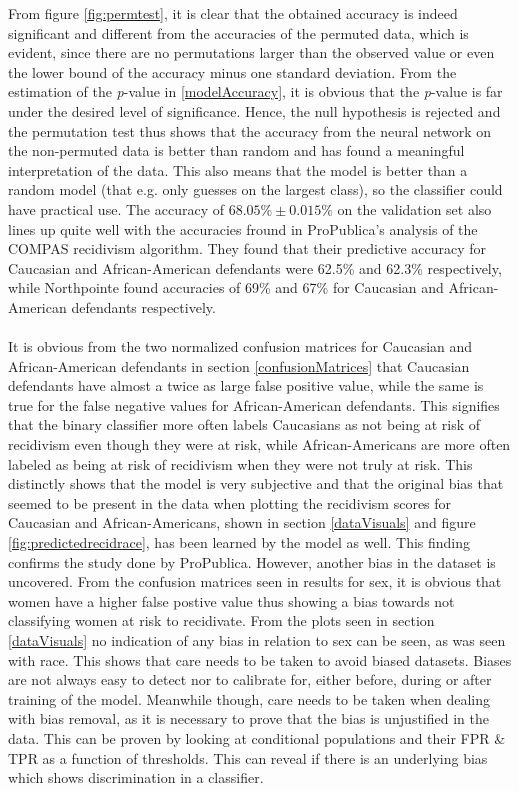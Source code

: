 \documentclass[11pt, fleqn, titlepage]{article}
\begin{document}
	From figure \ref{fig:permtest}, it is clear that the obtained accuracy is indeed significant and different from the accuracies of the permuted data, which is evident, since there are no permutations larger than the observed value or even the lower bound of the accuracy minus one standard deviation. From the estimation of the \textit{p}-value in \ref{modelAccuracy}, it is obvious that the \textit{p}-value is far under the desired level of significance. Hence, the null hypothesis is rejected and the permutation test thus shows that the accuracy from the neural network on the non-permuted data is better than random and has found a meaningful interpretation of the data. This also means that the model is better than a random model (that e.g. only guesses on the largest class), so the classifier could have practical use. The accuracy of $68.05\% \pm 0.015\%$ on the validation set also lines up quite well with the accuracies fround in ProPublica's analysis of the COMPAS recidivism algorithm. They found that their predictive accuracy for Caucasian and African-American defendants were 62.5\% and 62.3\% respectively, while Northpointe found accuracies of 69\% and 67\% for Caucasian and African-American defendants respectively. \cite{propublicaAnalysis} \\\\
	\noindent
	It is obvious from the two normalized confusion matrices for Caucasian and African-American defendants in section \ref{confusionMatrices} that Caucasian defendants have almost a twice as large false positive value, while the same is true for the false negative values for African-American defendants. This signifies that the binary classifier more often labels Caucasians as not being at risk of recidivism even though they were at risk, while African-Americans are more often labeled as being at risk of recidivism when they were not truly at risk. This distinctly shows that the model is very subjective and that the original bias that seemed to be present in the data when plotting the recidivism scores for Caucasian and African-Americans, shown in section \ref{dataVisuals} and figure \ref{fig:predictedrecidrace}, has been learned by the model as well. This finding confirms the study done by ProPublica. However, another bias in the dataset is uncovered. From the confusion matrices seen in results for sex, it is obvious that women have a higher false postive value thus showing a bias towards not classifying women at risk to recidivate. From the plots seen in section \ref{dataVisuals} no indication of any bias in relation to sex can be seen, as was seen with race. This shows that care needs to be taken to avoid biased datasets. Biases are not always easy to detect nor to calibrate for, either before, during or after training of the model. Meanwhile though, care needs to be taken when dealing with bias removal, as it is necessary to prove that the bias is unjustified in the data. This can be proven by looking at conditional populations and their FPR \& TPR as a function of thresholds. This can reveal if there is an underlying bias which shows discrimination in a classifier. 
	
\end{document}

